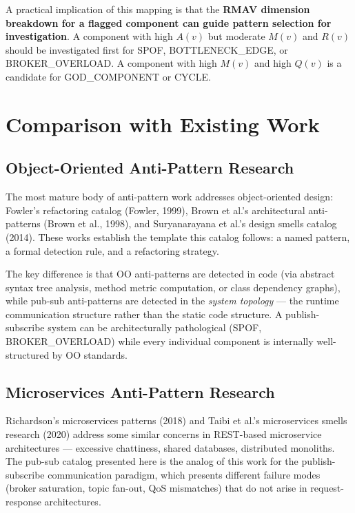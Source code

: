 \documentclass[11pt]{article}
\begin{document}
A practical implication of this mapping is that the \textbf{RMAV dimension breakdown for a flagged component can guide pattern selection for investigation}. A component with high $A(v)$ but moderate $M(v)$ and $R(v)$ should be investigated first for SPOF, BOTTLENECK\_EDGE, or BROKER\_OVERLOAD. A component with high $M(v)$ and high $Q(v)$ is a candidate for GOD\_COMPONENT or CYCLE.

\section{Comparison with Existing Work}

\subsection{Object-Oriented Anti-Pattern Research}

The most mature body of anti-pattern work addresses object-oriented design: Fowler's refactoring catalog (Fowler, 1999), Brown et al.'s architectural anti-patterns (Brown et al., 1998), and Suryanarayana et al.'s design smells catalog (2014). These works establish the template this catalog follows: a named pattern, a formal detection rule, and a refactoring strategy.

The key difference is that OO anti-patterns are detected in code (via abstract syntax tree analysis, method metric computation, or class dependency graphs), while pub-sub anti-patterns are detected in the \emph{system topology} --- the runtime communication structure rather than the static code structure. A publish-subscribe system can be architecturally pathological (SPOF, BROKER\_OVERLOAD) while every individual component is internally well-structured by OO standards.

\subsection{Microservices Anti-Pattern Research}

Richardson's microservices patterns (2018) and Taibi et al.'s microservices smells research (2020) address some similar concerns in REST-based microservice architectures --- excessive chattiness, shared databases, distributed monoliths. The pub-sub catalog presented here is the analog of this work for the publish-subscribe communication paradigm, which presents different failure modes (broker saturation, topic fan-out, QoS mismatches) that do not arise in request-response architectures.
\end{document}
